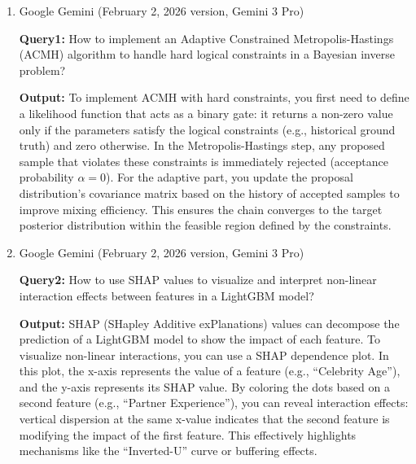 \documentclass{mcmthesis}
\begin{document}
\begin{enumerate}
\item Google Gemini (February 2, 2026 version, Gemini 3 Pro)

\textbf{Query1:} How to implement an Adaptive Constrained Metropolis-Hastings (ACMH) algorithm to handle hard logical constraints in a Bayesian inverse problem?

\textbf{Output:} To implement ACMH with hard constraints, you first need to define a likelihood function that acts as a binary gate: it returns a non-zero value only if the parameters satisfy the logical constraints (e.g., historical ground truth) and zero otherwise. In the Metropolis-Hastings step, any proposed sample that violates these constraints is immediately rejected (acceptance probability $\alpha = 0$). For the adaptive part, you update the proposal distribution's covariance matrix based on the history of accepted samples to improve mixing efficiency. This ensures the chain converges to the target posterior distribution within the feasible region defined by the constraints.

\item Google Gemini (February 2, 2026 version, Gemini 3 Pro)

\textbf{Query2:} How to use SHAP values to visualize and interpret non-linear interaction effects between features in a LightGBM model?

\textbf{Output:} SHAP (SHapley Additive exPlanations) values can decompose the prediction of a LightGBM model to show the impact of each feature. To visualize non-linear interactions, you can use a SHAP dependence plot. In this plot, the x-axis represents the value of a feature (e.g., ``Celebrity Age''), and the y-axis represents its SHAP value. By coloring the dots based on a second feature (e.g., ``Partner Experience''), you can reveal interaction effects: vertical dispersion at the same x-value indicates that the second feature is modifying the impact of the first feature. This effectively highlights mechanisms like the ``Inverted-U'' curve or buffering effects.
\end{enumerate}
\end{document}
